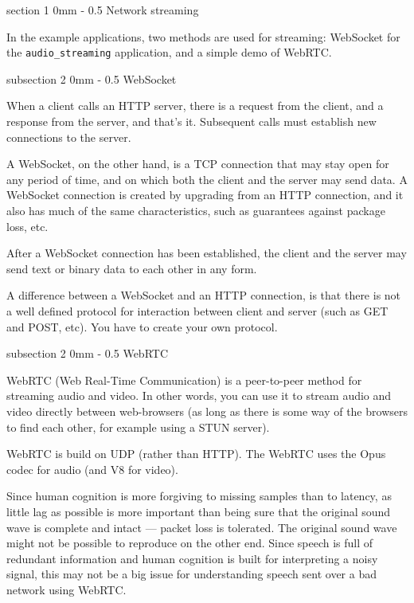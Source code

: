 \documentclass[11pt, a4paper, twoside]{article}
\makeatletter
\renewcommand{\subsection}{\@startsection
  {subsection}%
  {2}%
  {0mm}%
  {-\baselineskip}%
  {0.5\baselineskip}%
  {\bfseries\sffamily\large}}%
\renewcommand{\section}{\@startsection
  {section}%
  {1}%
  {0mm}%
  {-\baselineskip}%
  {0.5\baselineskip}%
  {\bfseries\sffamily\Large}}%
\makeatother
\begin{document}
\section{Network streaming}

In the example applications, two methods are used for streaming: WebSocket for the {\tt audio\_streaming} application, and a simple demo of WebRTC.

\subsection{WebSocket}

When a client calls an HTTP server, there is a request from the
client, and a response from the server, and that's it. Subsequent
calls must establish new connections to the server.

A WebSocket, on the other hand, is a TCP connection that may stay open
for any period of time, and on which both the client and the server
may send data. A WebSocket connection is created by upgrading from an
HTTP connection, and it also has much of the same characteristics,
such as guarantees against package loss, etc.

After a WebSocket connection has been established, the
client and the server may send text or binary data to each other in
any form.

A difference between a WebSocket and an HTTP connection, is that
there is not a well defined protocol for interaction between client
and server (such as GET and POST, etc). You have to create your own
protocol. 

\subsection{WebRTC}

WebRTC (Web Real-Time Communication) \cite{webrtc} is a peer-to-peer method for
streaming audio and video. In other words, you can use it to stream
audio and video directly between web-browsers (as long as there is
some way of the browsers to find each other, for example using a STUN
server).

WebRTC is build on UDP (rather than HTTP). The WebRTC uses the Opus
codec for audio (and V8 for video).

Since human cognition is more forgiving to missing samples than to
latency, as little lag as possible is more important than being sure
that the original sound wave is complete and intact --- packet loss is
tolerated. The original sound wave might not be possible to reproduce
on the other end. Since speech is full of redundant information and
human cognition is built for interpreting a noisy signal, this may not
be a big issue for understanding speech sent over a bad network using
WebRTC.
\end{document}

